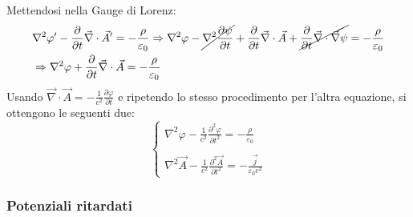 \documentclass[10pt, a4paper]{scrartcl}
\numberwithin{equation}{subsection}
\theoremstyle{style1}
\begin{document}
Mettendosi nella Gauge di Lorenz:
\[
\begin{split}
	&\nabla ^2 \varphi'  - \frac{\partial }{\partial t} \vec{\nabla }\cdot \vec{A}' = - \frac{\rho }{\varepsilon _0}\Rightarrow \nabla ^2 \varphi  - \cancel{\nabla ^2 \frac{\partial \psi }{\partial t} } + \frac{\partial }{\partial t} \vec{\nabla }\cdot \vec{A}+\cancel{\frac{\partial }{\partial t} \vec{\nabla }\cdot \vec{\nabla }\psi}  = - \frac{\rho }{\varepsilon _0}\\
	&\Rightarrow \nabla ^2 \varphi  + \frac{\partial }{\partial t} \vec{\nabla }\cdot \vec{A}=-\frac{\rho }{\varepsilon _0}
\end{split}
\] 
Usando $\vec{\nabla }\cdot \vec{A}= - \frac{1}{c^2}\frac{\partial \varphi }{\partial t} $ e ripetendo lo stesso procedimento per l'altra equazione, si ottengono le seguenti due:
\begin{equation}
	\begin{cases}
	\displaystyle \nabla ^2 \varphi  - \frac{1}{c^2 }\frac{\partial ^2 \varphi }{\partial t^2} = - \frac{\rho }{\varepsilon _0}\\
	\\
	\displaystyle \nabla ^2 \vec{A}- \frac{1}{c^2}\frac{\partial ^2\vec{A}}{\partial t^2} = - \frac{\vec{j}}{\varepsilon _0c^2}
	\end{cases}
\end{equation}
\subsubsection{Potenziali ritardati}
\end{document}
